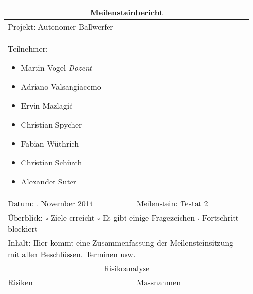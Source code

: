 \begin{table}[!h]
	\renewcommand{\arraystretch}{1.5}
	\begin{tabularx}{\linewidth}{|X|X|}
		\hline
		\multicolumn{2}{|c|}{
			\parbox[0pt][3em][c]{0cm}{}
			{\large \textbf{Meilensteinbericht}}
		} \\
		\hline
		\multicolumn{2}{|l|}{Projekt: Autonomer Ballwerfer} \\
		\hline
		\multicolumn{2}{|X|}{
			Teilnehmer:
			\begin{itemize}
				\setlength\itemsep{0em}
				\item Martin Vogel \textit{Dozent}
				\item Adriano Valsangiacomo
				\item Ervin Mazlagi\'c
				\item Christian Spycher
				\item Fabian Wüthrich
				\item Christian Schürch
				\item Alexander Suter
			\end{itemize}
		} \\
		\hline
		Datum: . November 2014 & Meilenstein: Testat 2 \\
		\hline
		\multicolumn{2}{|X|}{
			Überblick: \newline
			$\square$ Ziele erreicht \newline 
			$\square$ Es gibt einige Fragezeichen \newline
			$\square$ Fortschritt blockiert
		} \\
		\hline
		\multicolumn{2}{|X|}{
			Inhalt: \newline
			Hier kommt eine Zusammenfassung der Meilensteinsitzung mit allen Beschlüssen, Terminen usw.	
		} \\
		\hline
		\multicolumn{2}{|c|}{Risikoanalyse} \\
		\hline
		Risiken & Massnahmen \\
		\hline
	\end{tabularx}
\end{table}
